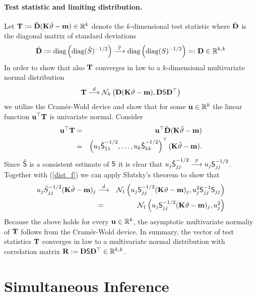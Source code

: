 \documentclass[12pt]{article}
\begin{document}
\paragraph{Test statistic and limiting distribution.}

Let $\T := \hat{\D} (\K \hat{\vartheta} - \m) \in \R^k$ denote
the $k$-dimensional test statistic where $\hat{\D}$ is the diagonal
matrix of standard deviations
\begin{eqnarray*}
\hat{\D} := \text{diag}\left(\text{diag}(\hat{S})^{-1/2}\right) \cP 
\text{diag}\left(\text{diag}(S)^{-1/2}\right) =: \D \in \R^{k,k}
\end{eqnarray*}
In order to show that also $\T$ converges in law to a $k$-dimensional multivariate
normal distribution
\begin{eqnarray*}
\T \cL \N_k\left(\D(\K \vartheta - \m), \D \S \D^\top\right)
\end{eqnarray*}
we utilize the Cram{\'e}r-Wold device and show that for some $\uu \in \R^k$ 
the linear function $\uu^\top \T$ is univariate normal. Consider
\begin{eqnarray*}
\uu^\top \T & = & \uu^\top \hat{\D} (\K \hat{\vartheta} - \m) \\
& = & \left(u_1 \hat{\S}_{11}^{-1/2}, \dots, u_k \hat{\S}_{kk}^{-1/2}\right)^\top(\K \hat{\vartheta} - \m).
\end{eqnarray*}
Since $\hat{\S}$ is a consistent estimate of $\S$ it 
is clear that $u_j \hat{\S}_{jj}^{-1/2} \cP u_j \S_{jj}^{-1/2}$.
Together with (\ref{dist_f}) we can apply Slutsky's theorem to show that
\begin{eqnarray*}
u_j \hat{S}_{jj}^{-1/2} (\K \hat{\vartheta} - \m)_j & \cL &  
\N_1\left(u_j \S_{jj}^{-1/2} (\K \vartheta - \m)_j, u_j^2 \S_{jj}^{-1} \S_{jj}\right) \\
& = & \N_1\left(u_j \S_{jj}^{-1/2} (\K \vartheta - \m)_j, u_j^2\right)
\end{eqnarray*}
Because the above holds for every $\uu \in \R^k$, the asymptotic multivariate
normaliy of $\T$ follows from the Cram{\'e}r-Wold device. In summary,
the vector of test statistics $\T$ converges in law to a multivariate
normal distribution with correlation matrix $\Cor := \D \S \D^\top \in \R^{k,k}$.

\section{Simultaneous Inference}
\end{document}
